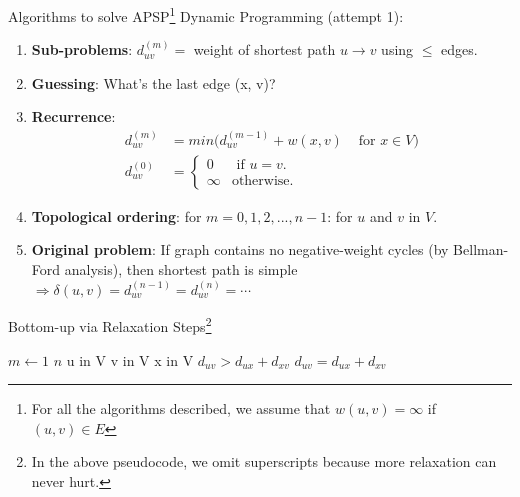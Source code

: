 \documentclass{beamer}
\begin{document}
\begin{frame}{Algorithms to solve APSP\footnote{\scriptsize For all the algorithms described, we assume that $w(u, v) = \infty$ if $(u, v) \in E$}}
    Dynamic Programming (attempt 1):
    \begin{enumerate}
    \scriptsize
        \item \textbf{Sub-problems}: $d_{uv}^{(m)} =$ weight of shortest path $u \rightarrow v$ using $\leq$ edges.
        \item \textbf{Guessing}: What's the last edge (x, v)?
        \item \textbf{Recurrence}:
        \begin{equation*}
            \begin{align*}
                d_{uv}^{(m)} &= min( d_{uv}^{(m - 1)} + w(x, v) & \text{ for } x \in V) \\
                d_{uv}^{(0)} &=
                    \begin{cases}
                        0 & \text{ if } u = v. \\
                        \infty & \text{otherwise}.
                    \end{cases}
            \end{align*}
        \end{equation*}
        \item \textbf{Topological ordering}: for $m = 0, 1, 2, . . . , n - 1$: for $u$ and $v$ in $V$.
        \item \textbf{Original problem}: If graph contains no negative-weight cycles (by Bellman-Ford analysis), then shortest path is simple $\Rightarrow \delta(u, v) = d_{uv}^{(n - 1)} = d_{uv}^{(n)} = \cdots$
    \end{enumerate}
\end{frame}

\begin{frame}{Bottom-up via Relaxation Steps\footnote{{\scriptsize In the above pseudocode, we omit superscripts because more relaxation can never hurt.}}}
    \begin{codebox}
        \li \For $m \gets 1$ \To $n$ 
        \li \hspace{0.5cm} \For u in V
        \li \hspace{1.0cm} \For v in V
        \li \hspace{1.5cm} \For x in V
        \li \hspace{2.0cm} \If $d_{uv} > d_{ux} + d_{xv}$
        \li \hspace{2.5cm} \If $d_{uv} = d_{ux} + d_{xv}$
    \end{codebox}
\end{frame}
\end{document}
